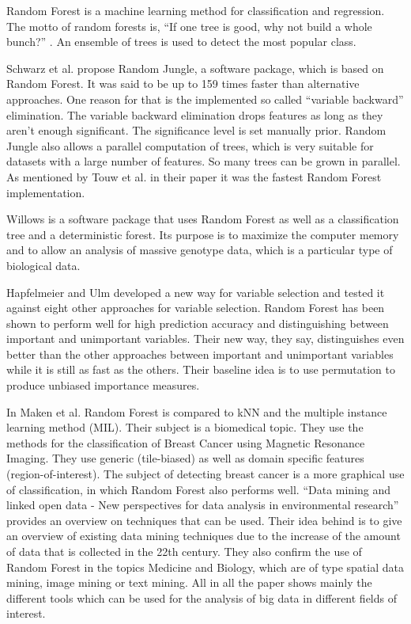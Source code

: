 \documentclass{sig-alternate-05-2015}
\begin{document}
Random Forest \cite{breiman2001random} is a machine learning method for classification and regression. The motto of random forests is, ``If one tree is good, why not build a whole bunch?'' \cite{Robillard:recomm_sys_sw_eng}. An ensemble of trees is used to detect the most popular class.


Schwarz et al. \cite{schwarz2010safari} propose Random Jungle, a software package, which is based on Random Forest. It was said to be up to 159 times faster than alternative approaches. One reason for that is the implemented so called ``variable backward'' elimination. The variable backward elimination drops features as long as they aren't enough significant. The significance level is set manually prior.  Random Jungle also allows a parallel computation of trees, which is very suitable for datasets with a large number of features. So many trees can be grown in parallel. As mentioned by Touw et al. in their paper it was the fastest Random Forest implementation. 

Willows \cite{zhang2009willows} is a software package that uses Random Forest as well as a classification tree and a deterministic forest. Its purpose is to maximize the computer memory and to allow an analysis of massive genotype data, which is a particular type of biological data. 

Hapfelmeier and Ulm \cite{hapfelmeier2013new} developed a new way for variable selection and tested it against eight other approaches for variable selection. Random Forest has been shown to perform well for high prediction accuracy and distinguishing between important and unimportant variables. Their new way, they say, distinguishes even better than the other approaches between important and unimportant variables while it is still as fast as the others. Their baseline idea is to use permutation to produce unbiased importance measures.

In Maken et al. \cite{maken2014multiple} Random Forest is compared to kNN and the multiple instance learning method (MIL). Their subject is a biomedical topic. They use the methods for the classification of Breast Cancer using Magnetic Resonance Imaging. They use generic (tile-biased) as well as domain specific features (region-of-interest). The subject of detecting breast cancer is a more graphical use of classification, in which Random Forest also performs well.
``Data mining and linked open data - New perspectives for data analysis in environmental research'' \cite{lausch2015data} provides an overview on techniques that can be used. Their idea behind is to give an overview of existing data mining techniques due to the increase of the amount of data that is collected in the 22th century. They also confirm the use of Random Forest in the topics Medicine and Biology, which are of type spatial data mining, image mining or text mining. All in all the paper shows mainly the different tools which can be used for the analysis of big data in different fields of interest.
\end{document}
